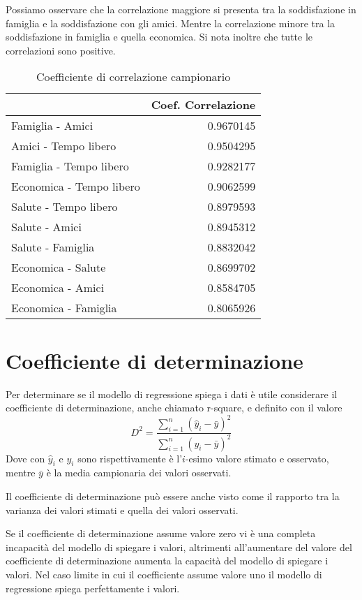 \documentclass[]{book}
\begin{document}
Possiamo osservare che la correlazione maggiore si presenta tra la
soddisfazione in famiglia e la soddisfazione con gli amici. Mentre la
correlazione minore tra la soddisfazione in famiglia e quella economica.
Si nota inoltre che tutte le correlazioni sono positive.

\begin{table}

\caption{\label{tab:correlazioni-ordinate}Coefficiente di correlazione campionario}
\centering
\begin{tabular}[t]{l|r}
\hline
  & Coef. Correlazione\\
\hline
Famiglia - Amici & 0.9670145\\
\hline
Amici - Tempo libero & 0.9504295\\
\hline
Famiglia - Tempo libero & 0.9282177\\
\hline
Economica - Tempo libero & 0.9062599\\
\hline
Salute - Tempo libero & 0.8979593\\
\hline
Salute - Amici & 0.8945312\\
\hline
Salute - Famiglia & 0.8832042\\
\hline
Economica - Salute & 0.8699702\\
\hline
Economica - Amici & 0.8584705\\
\hline
Economica - Famiglia & 0.8065926\\
\hline
\end{tabular}
\end{table}

\section{Coefficiente di
determinazione}\label{coefficiente-di-determinazione}

Per determinare se il modello di regressione spiega i dati è utile
considerare il coefficiente di determinazione, anche chiamato r-square,
e definito con il valore
\[D^2=\frac{\sum_{i=1}^n(\hat{y}_i-\bar{y})^2}{\sum_{i=1}^n(y_i-\bar{y})^2}\]
Dove con \(\hat{y}_i\) e \(y_i\) sono rispettivamente è l'\(i\)-esimo
valore stimato e osservato, mentre \(\bar{y}\) è la media campionaria
dei valori osservati.

Il coefficiente di determinazione può essere anche visto come il
rapporto tra la varianza dei valori stimati e quella dei valori
osservati.

Se il coefficiente di determinazione assume valore zero vi è una
completa incapacità del modello di spiegare i valori, altrimenti
all'aumentare del valore del coefficiente di determinazione aumenta la
capacità del modello di spiegare i valori. Nel caso limite in cui il
coefficiente assume valore uno il modello di regressione spiega
perfettamente i valori.
\end{document}
